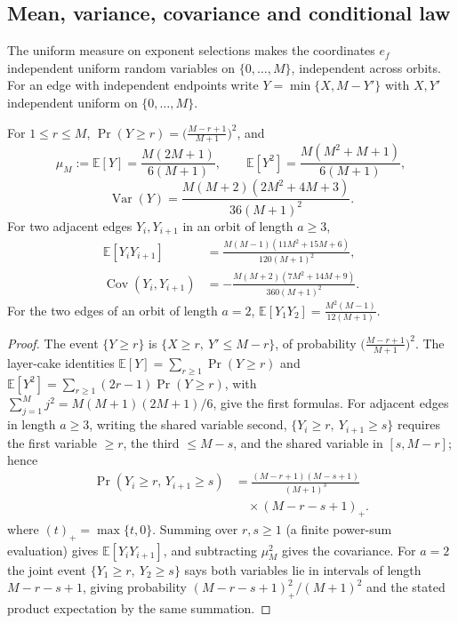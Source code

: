 \subsection{Mean, variance, covariance and conditional law}
\label{sec:moments}

The uniform measure on exponent selections makes the coordinates $e_f$
independent uniform random variables on $\{0,\ldots,M\}$, independent across
orbits.  For an edge with independent endpoints write
$Y=\min\{X,M-Y'\}$ with $X,Y'$ independent uniform on $\{0,\ldots,M\}$.

\begin{lemma}\label{lem:edge-moments}
For $1\leq r\leq M$,
$\Pr(Y\geq r)=\bigl(\frac{M-r+1}{M+1}\bigr)^2$, and
{\small
\[
\mu_M:=\mathbb{E}[Y]=\frac{M(2M+1)}{6(M+1)},\qquad
\mathbb{E}[Y^2]=\frac{M(M^2+M+1)}{6(M+1)},
\]
}
\[
\operatorname{Var}(Y)
 =\frac{M(M+2)(2M^2+4M+3)}{36(M+1)^2}.
\]
For two adjacent edges $Y_i,Y_{i+1}$ in an orbit of length $a\geq3$,
\begin{align*}
\mathbb{E}[Y_iY_{i+1}]
 &=\frac{M(M-1)(11M^2+15M+6)}{120(M+1)^2},\\
\operatorname{Cov}(Y_i,Y_{i+1})
 &=-\frac{M(M+2)(7M^2+14M+9)}{360(M+1)^2}.
\end{align*}
For the two edges of an orbit of length $a=2$,
$\mathbb{E}[Y_1Y_2]=\frac{M^2(M-1)}{12(M+1)}$.
\end{lemma}

\begin{proof}
The event $\{Y\geq r\}$ is $\{X\geq r,\ Y'\leq M-r\}$, of probability
$\bigl(\frac{M-r+1}{M+1}\bigr)^2$.  The layer-cake identities
$\mathbb{E}[Y]=\sum_{r\geq1}\Pr(Y\geq r)$ and
$\mathbb{E}[Y^2]=\sum_{r\geq1}(2r-1)\Pr(Y\geq r)$, with
$\sum_{j=1}^{M}j^2=M(M+1)(2M+1)/6$, give the first formulas.
For adjacent edges in length $a\geq3$, writing the shared variable second,
$\{Y_i\geq r,\ Y_{i+1}\geq s\}$ requires the first variable $\geq r$, the
third $\leq M-s$, and the shared variable in $[s,M-r]$; hence
\[
\begin{aligned}
\Pr(Y_i\geq r,\,Y_{i+1}\geq s)
&=\frac{(M-r+1)(M-s+1)}
{(M+1)^3}\\
&\quad\times (M-r-s+1)_+.
\end{aligned}
\]
where $(t)_+=\max\{t,0\}$.  Summing over $r,s\geq1$ (a finite power-sum
evaluation) gives $\mathbb{E}[Y_iY_{i+1}]$, and subtracting $\mu_M^2$ gives
the covariance.  For $a=2$ the joint event
$\{Y_1\geq r,\ Y_2\geq s\}$ says both variables lie in intervals of length
$M-r-s+1$, giving probability $(M-r-s+1)_+^2/(M+1)^2$ and the stated product
expectation by the same summation.
\end{proof}

